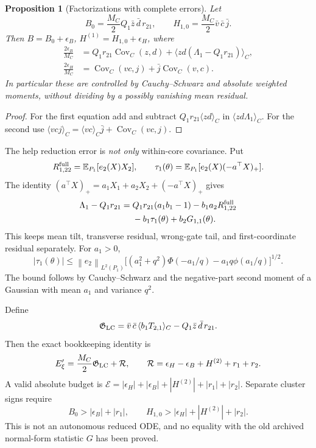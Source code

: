 \documentclass[11pt]{article}
\numberwithin{equation}{section}
\newtheorem{proposition}{Proposition}[section]
\theoremstyle{definition}
\theoremstyle{remark}
\newcommand{\E}{\mathbb E}
\newcommand{\1}{\mathbf 1}
\newcommand{\norm}[1]{\left\lVert #1\right\rVert}
\DeclareMathOperator{\Cov}{Cov}
\begin{document}
\begin{proposition}[Factorizations with complete errors]\label{pa:factorizations}
Let
\[
 B_0=\frac{M_C}{2}Q_1\bar z\,\bar d\,r_{21},\qquad
 H_{1,0}=\frac{M_C}{2}\bar v\,\bar c\,\bar j.
\]
Then $B=B_0+\epsilon_B$, $H^{(1)}=H_{1,0}+\epsilon_H$, where
\begin{align}
 \frac{2\epsilon_B}{M_C}
 &=Q_1r_{21}\Cov_C(z,d)
 +\langle zd(\Lambda_1-Q_1r_{21})\rangle_C,\label{pa:epsilonB}\\
 \frac{2\epsilon_H}{M_C}
 &=\Cov_C(vc,j)+\bar j\Cov_C(v,c).\label{pa:epsilonH}
\end{align}
In particular these are controlled by Cauchy--Schwarz and absolute weighted
moments, without dividing by a possibly vanishing mean residual.
\end{proposition}
\begin{proof}
For the first equation add and subtract
$Q_1r_{21}\langle zd\rangle_C$ in $\langle zd\Lambda_1\rangle_C$.
For the second use
$\langle vcj\rangle_C=\langle vc\rangle_C\bar j+\Cov_C(vc,j)$.
\end{proof}
The help reduction error is \emph{not only} within-core covariance. Put
\[
 R^{\rm full}_{1,22}=\E_{P_1}[e_2(X)X_2],\qquad
 \tau_1(\theta)=\E_{P_1}[e_2(X)(-a^\top X)_+].
\]
The identity $(a^\top X)_+=a_1X_1+a_2X_2+(-a^\top X)_+$ gives
\begin{align}\label{pa:helpdefect}
 \Lambda_1-Q_1r_{21}
 ={}&Q_1r_{21}(a_1b_1-1)-b_1a_2R^{\rm full}_{1,22}\nonumber\\
 &-b_1\tau_1(\theta)+b_2G_{1,1}(\theta).
\end{align}
This keeps mean tilt, transverse residual, wrong-gate tail, and first-coordinate
residual separately. For $a_1>0$,
\[
 |\tau_1(\theta)|\le\norm{e_2}_{L^2(P_1)}
 \big[(a_1^2+q^2)\Phi(-a_1/q)-a_1q\phi(a_1/q)\big]^{1/2}.
\]
The bound follows by Cauchy--Schwarz and the negative-part second moment of
a Gaussian with mean $a_1$ and variance $q^2$.

Define
\begin{equation}\label{pa:GLC}
 \mathfrak G_{\rm LC}=\bar v\,\bar c\,\langle b_1T_{2,1}\rangle_C
 -Q_1\bar z\,\bar d\,r_{21}.
\end{equation}
Then the exact bookkeeping identity is
\begin{equation}\label{pa:GLCidentity}
 E_\xi'=\frac{M_C}{2}\mathfrak G_{\rm LC}+\mathcal R,\qquad
 \mathcal R=\epsilon_H-\epsilon_B+H^{(2)}+r_1+r_2.
\end{equation}
A valid absolute budget is
$\mathcal E=|\epsilon_H|+|\epsilon_B|+|H^{(2)}|+|r_1|+|r_2|$.
Separate cluster signs require
\[
 B_0>|\epsilon_B|+|r_1|,\qquad
 H_{1,0}>|\epsilon_H|+|H^{(2)}|+|r_2|.
\]
This is not an autonomous reduced ODE, and no equality with the old archived
normal-form statistic $G$ has been proved.
\end{document}
